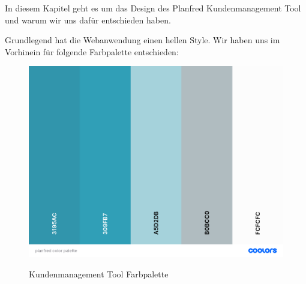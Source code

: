 In diesem Kapitel geht es um das Design des Planfred Kundenmanagement Tool und warum wir uns dafür entschieden haben.

Grundlegend hat die Webanwendung einen hellen Style. Wir haben uns im Vorhinein für folgende Farbpalette entschieden:

\begin{figure}[h!]
    \centering
    \includegraphics[width=1\textwidth]{pics/planfred-color-palette.png}
    \caption{Kundenmanagement Tool Farbpalette}
    \cite{frontend_design_colors}
    \label{fig:mesh1}
\end{figure}
